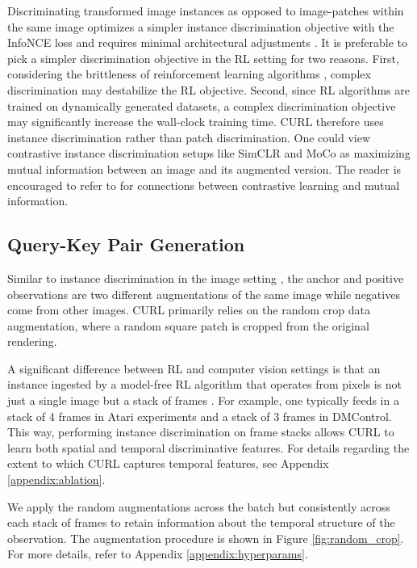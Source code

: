 \documentclass{article}
\begin{document}
Discriminating transformed image instances as opposed to image-patches within the same image optimizes a simpler instance discrimination objective \cite{wu2018unsupervised} with the InfoNCE loss and requires minimal architectural adjustments \cite{kaiming2019moco, chen2020simclr}. It is preferable to pick a simpler discrimination objective in the RL setting for two reasons. First, considering the brittleness of reinforcement learning algorithms \cite{henderson2018deep}, complex discrimination may destabilize the RL objective. Second, since RL algorithms are trained on dynamically generated datasets, a complex discrimination objective may significantly increase the wall-clock training time. CURL therefore uses instance discrimination rather than patch discrimination.  One could view contrastive instance discrimination setups like SimCLR and MoCo as maximizing mutual information between an image and its augmented version. The reader is encouraged to refer to \citet{oord2018representation, hjelm2018learning, tschannen2019mutual} for connections between contrastive learning and mutual information. 


\subsection{Query-Key Pair Generation}
Similar to instance discrimination in the image setting \cite{kaiming2019moco, chen2020simclr}, the anchor and positive observations are two different augmentations of the same image while negatives come from other images. CURL primarily relies on the random crop data augmentation, where a random square patch is cropped from the original rendering.

A significant difference between RL and computer vision settings is that an instance ingested by a model-free RL algorithm that operates from pixels is not just a single image but a stack of frames \cite{mnih2015human}. For example, one typically feeds in a stack of 4 frames in Atari experiments and a stack of 3 frames in DMControl. This way, performing instance discrimination on frame stacks allows CURL to learn both spatial and temporal discriminative features. For details regarding the extent to which CURL captures temporal features, see Appendix \ref{appendix:ablation}.

We apply the random augmentations across the batch but consistently across each stack of frames to retain information about the temporal structure of the observation. The augmentation procedure is shown in Figure \ref{fig:random_crop}. For more details, refer to Appendix \ref{appendix:hyperparams}.
\end{document}
